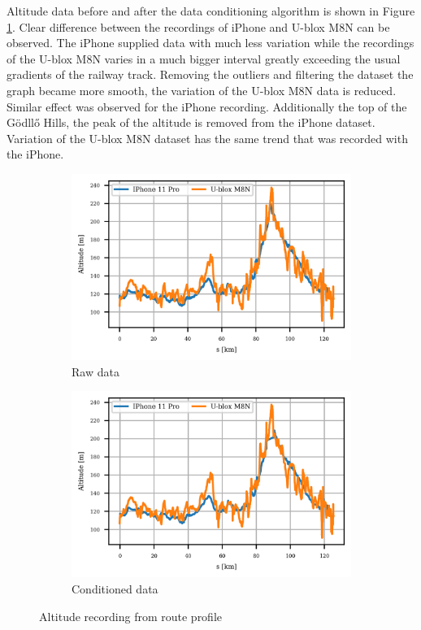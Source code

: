 \documentclass{article}
\begin{document}
			Altitude data before and after the data conditioning algorithm is shown in Figure \ref{fig:route_alt}. Clear difference between the recordings of iPhone and U-blox M8N can be observed. The iPhone supplied data with much less variation while the recordings of the U-blox M8N varies in a much bigger interval greatly exceeding the usual gradients of the railway track. Removing the outliers and filtering the dataset the graph became more smooth, the variation of the U-blox M8N data is reduced. Similar effect was observed for the iPhone recording. Additionally the top of the Gödllő Hills, the peak of the altitude is removed from the iPhone dataset. Variation of the U-blox M8N dataset has the same trend that was recorded with the iPhone.
			\begin{figure}[h]
		   		\centering
		     	\begin{subfigure}[b]{0.45\textwidth}
		      		\centering
		      	  	\includegraphics[width=\textwidth]{Route/raw_alt.png}
		      	  	\caption{Raw data}
		     	\end{subfigure}
		     	\begin{subfigure}[b]{0.45\textwidth}
		      	   \centering
		      	   \includegraphics[width=\textwidth]{Route/cond_alt.png}
		      	   \caption{Conditioned data}
		     	\end{subfigure}
			   \caption{Altitude recording from route profile}
			   \label{fig:route_alt}
		   \end{figure}
\end{document}
